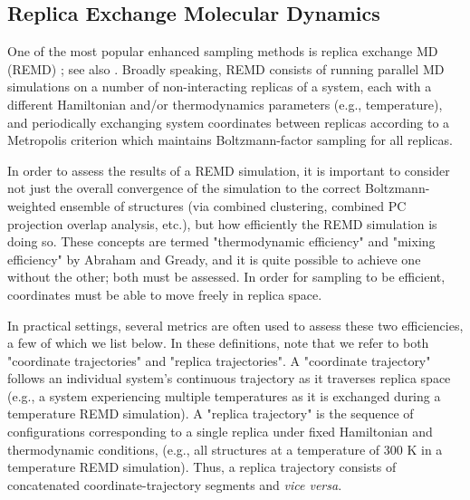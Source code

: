 \subsection{Replica Exchange Molecular Dynamics}
One of the most popular enhanced sampling methods is replica exchange MD (REMD) \citep{Sugita1999}; see also \cite{Swendsen-1986}. Broadly speaking, REMD consists of running parallel MD simulations on a number of non-interacting replicas of a system, each with a different Hamiltonian and/or thermodynamics parameters (e.g., temperature), and periodically exchanging system coordinates between replicas according to a Metropolis criterion which maintains Boltzmann-factor sampling for all replicas.  



In order to assess the results of a REMD simulation, it is important to consider not just the overall convergence of the simulation to the correct Boltzmann-weighted ensemble of structures (via combined clustering, combined PC projection overlap analysis, etc.), but how efficiently the REMD simulation is doing so. These concepts are termed "thermodynamic efficiency" and "mixing efficiency" by Abraham and Gready,\citep{Abraham2008} and it is quite possible to achieve one without the other; both must be assessed. In order for sampling to be efficient, coordinates must be able to move freely in replica space.

In practical settings, several metrics are often used to assess these two efficiencies, a few of which we list below.  In these definitions, note that we refer to both "coordinate trajectories" and "replica trajectories". A "coordinate trajectory" follows an individual system's continuous trajectory as it traverses replica space (e.g., a system experiencing multiple temperatures as it is exchanged during a temperature REMD simulation). A "replica trajectory" is the sequence of configurations corresponding to a single replica under fixed Hamiltonian and thermodynamic conditions, (e.g., all structures at a temperature of 300 K in a temperature REMD simulation).  Thus, a replica trajectory consists of concatenated coordinate-trajectory segments and \textit{vice versa}.

